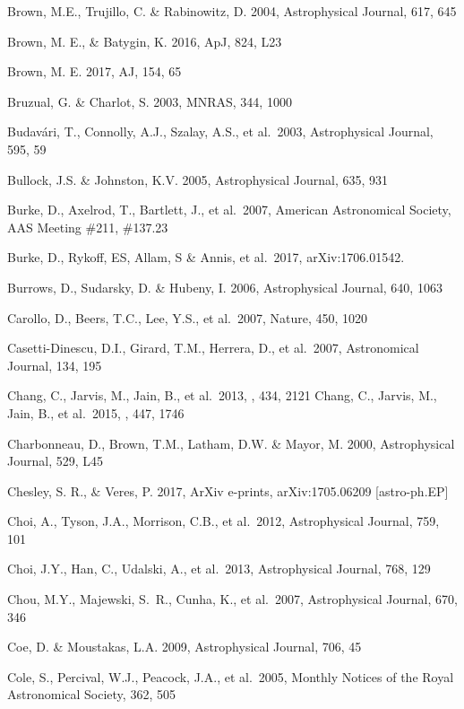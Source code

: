 \documentclass{emulateapj}
\begin{document}
\begin{thebibliography}{}
\bibitem[()]{} Brown, M.E., Trujillo, C. \& Rabinowitz, D. 2004, Astrophysical Journal, 617, 645

\bibitem[()]{} Brown, M. E., \& Batygin, K. 2016, ApJ, 824, L23

\bibitem[()]{}  Brown, M. E. 2017, AJ, 154, 65

\bibitem[()]{} Bruzual, G. \& Charlot, S. 2003, MNRAS, 344, 1000

\bibitem[()]{} Budav\'{a}ri, T., Connolly, A.J., Szalay, A.S., et al.~2003, Astrophysical Journal, 595, 59

\bibitem[()]{} Bullock, J.S. \& Johnston, K.V. 2005,  Astrophysical Journal, 635, 931

\bibitem[()]{} Burke, D., Axelrod, T., Bartlett, J., et al.~2007,
                      American Astronomical Society, AAS Meeting \#211, \#137.23

\bibitem[()]{} Burke, D., Rykoff, ES, Allam, S \& Annis, et al.~2017, arXiv:1706.01542.

\bibitem[()]{} Burrows, D., Sudarsky, D. \& Hubeny, I. 2006, Astrophysical Journal, 640, 1063

\bibitem[()]{} Carollo, D., Beers, T.C., Lee, Y.S., et al.~2007, Nature, 450, 1020

\bibitem[()]{} Casetti-Dinescu, D.I., Girard, T.M., Herrera, D., et al.~2007, Astronomical Journal, 134, 195

\bibitem[()]{} Chang, C., Jarvis, M., Jain, B., et al.\ 2013, \mnras, 434, 2121
\bibitem[()]{} Chang, C., Jarvis, M., Jain, B., et al.\ 2015, \mnras, 447, 1746

\bibitem[()]{} Charbonneau, D., Brown, T.M., Latham, D.W. \& Mayor, M. 2000, Astrophysical Journal, 529, L45

\bibitem[()]{} Chesley, S. R., $\&$ Veres, P. 2017, ArXiv e-prints, arXiv:1705.06209 [astro-ph.EP]

\bibitem[()]{} Choi, A., Tyson, J.A., Morrison, C.B., et al.~2012, Astrophysical Journal, 759, 101

\bibitem[()]{} Choi, J.Y., Han, C., Udalski, A., et al.~2013, Astrophysical Journal, 768, 129

\bibitem[()]{} Chou, M.Y., Majewski, S.~R., Cunha, K., et al.~2007, Astrophysical Journal, 670, 346

\bibitem[()]{} Coe, D. \& Moustakas, L.A. 2009, Astrophysical Journal, 706, 45

\bibitem[()]{} Cole, S., Percival, W.J., Peacock, J.A., et al.~2005, Monthly Notices of the Royal
             Astronomical Society, 362, 505


\end{thebibliography}
\end{document}
